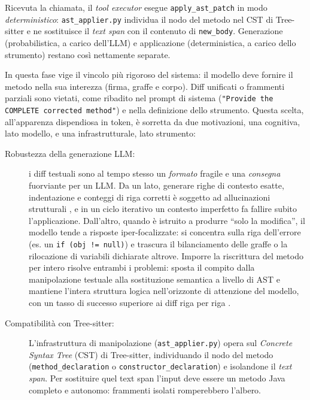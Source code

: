 Ricevuta la chiamata, il \textit{tool executor} esegue \texttt{apply\_ast\_patch} in modo \emph{deterministico}:
\texttt{ast\_applier.py} individua il nodo del metodo nel CST di Tree-sitter e ne sostituisce il \textit{text span}
con il contenuto di \texttt{new\_body}. Generazione (probabilistica, a carico dell'LLM) e applicazione
(deterministica, a carico dello strumento) restano così nettamente separate.

In questa fase vige il vincolo più rigoroso del sistema: il modello deve fornire il metodo nella
sua interezza (firma, graffe e corpo). Diff unificati o frammenti parziali sono vietati, come ribadito
nel prompt di sistema (\texttt{"Provide the COMPLETE corrected method"}) e nella definizione dello strumento.
Questa scelta, all'apparenza dispendiosa in token, è sorretta da due motivazioni, una cognitiva,
lato modello, e una infrastrutturale, lato strumento:

\begin{description}
    \item[Robustezza della generazione LLM:] i diff testuali sono al tempo stesso un \emph{formato} fragile e una
    \emph{consegna} fuorviante per un LLM. Da un lato, generare righe di contesto esatte, indentazione e conteggi di
    riga corretti è soggetto ad allucinazioni strutturali \cite{zhang2024llmhallucinations}, e in un ciclo iterativo un
    contesto imperfetto fa fallire subito l'applicazione. Dall'altro, quando è istruito a produrre ``solo la
    modifica'', il modello tende a risposte iper-focalizzate: si concentra sulla riga dell'errore (es. un
    \texttt{if (obj != null)}) e trascura il bilanciamento delle graffe o la rilocazione di variabili dichiarate
    altrove. Imporre la riscrittura del metodo per intero risolve entrambi i problemi: sposta il compito dalla
    manipolazione testuale alla sostituzione semantica a livello di AST \cite{pabba2025semagent} e mantiene l'intera
    struttura logica nell'orizzonte di attenzione del modello, con un tasso di successo superiore ai diff riga per
    riga \cite{xia2023chatrepair}.

    \item[Compatibilità con Tree-sitter:] L'infrastruttura di manipolazione (\texttt{ast\_applier.py}) opera
    sul \textit{Concrete Syntax Tree} (CST) di Tree-sitter, individuando il nodo del metodo (\texttt{method\_declaration}
    o \texttt{constructor\_declaration}) e isolandone il \textit{text span}. Per sostituire quel text span l'input
    deve essere un metodo Java completo e autonomo: frammenti isolati romperebbero l'albero.
\end{description}
\clearpage
